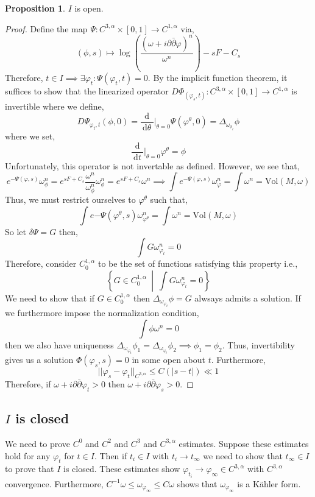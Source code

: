 \documentclass[12pt]{extarticle}
\renewcommand{\d}[1]{\: \mathrm{d}#1 \:}
\newcommand{\deriv}[2]{\frac{\d{#1}}{\d{#2}}}
\theoremstyle{definition}
\newtheorem{proposition}[theorem]{Proposition}
\begin{document}
\begin{proposition}
$I$ is open.
\end{proposition}

\begin{proof}
Define the map $\Psi : C^{3, \alpha} \times [0, 1] \to C^{1, \alpha}$ via,
\[ (\phi, s) \mapsto \log{\left( \frac{(\omega + i \partial \bar{\partial} \varphi)^n}{\omega^n} \right)} - s F - C_s \]
Therefore, $t \in I \implies \exists \varphi_t : \Psi(\varphi_t, t) = 0$. By the implicit function theorem, it suffices to show that the linearized operator $D \Phi_(\varphi_s, t) : C^{3, \alpha} \times [0, 1] \to C^{1, \alpha}$ is invertible where we define,
\[ D \Psi_{\varphi_t, t}(\phi, 0) = \deriv{}{\theta} \bigg|_{\theta = 0} \Psi(\varphi^\theta, 0) = \Delta_{\omega_{\phi_t}} \phi \] 
where we set,
\[ \deriv{}{t} \bigg|_{\theta = 0} \varphi^\theta = \phi \]
Unfortunately, this operator is not invertable as defined.
However, we see that,
\[ e^{- \Psi(\varphi, s)} \omega_{\phi}^n = e^{s F + C_s} \frac{\omega^n}{\omega_\phi^n} \omega_\phi^n = e^{s F + C_s} \omega^n \implies \int e^{-\Psi(\varphi, s)} \omega_{\varphi}^n = \int \omega^n = \mathrm{Vol}(M, \omega) \]
Thus, we must restrict ourselves to $\varphi^\theta$ such that,
\[ \int e{- \Psi(\varphi^\theta, s)} \omega_{\varphi^\theta}^n = \int \omega^n = \mathrm{Vol}(M, \omega) \]
So let $\delta \Psi = G$ then,
\[ \int G \omega_{\varphi_t}^n = 0 \]
Therefore, consider $C_0^{1, \alpha}$ to be the set of functions satisfying this property i.e.,
\[ \left\{ G \in C_0^{1, \alpha} \: \middle| \: \int G \omega_{\varphi_t}^n = 0 \right\} \]
We need to show that if $G \in C_0^{1, \alpha}$ then $\Delta_{\omega_{\varphi_t}} \phi = G$ alwsays admits a solution. If we furthermore impose the normalization condition,
\[ \int \phi \omega^n = 0 \]
then we also have uniqueness $\Delta_{\omega_{\varphi_t}} \phi_1 = \Delta_{\omega_{\varphi_t}} \phi_2 \implies \phi_1 =  \phi_2$. Thus, invertibility gives us a solution $\Phi(\varphi_s, s) = 0$ in some open about $t$. Furthermore,
\[ || \varphi_s - \varphi_t||_{C^{3, \alpha}} \le C(|s- t|) \ll 1 \]
Therefore, if $\omega + i \partial \bar{\partial} \varphi_t > 0$ then $\omega + i \partial \bar{\partial} \varphi_s > 0$. 
\end{proof}

\subsection{$I$ is closed}

We need to prove $C^0$ and $C^2$ and $C^3$ and $C^{3, \alpha}$ estimates. Suppose these estimates hold for any $\varphi_t$ for $t \in I$. Then if $t_i \in I$ with $t_i \to t_{\infty}$ we need to show that $t_{\infty} \in I$ to prove that $I$ is closed. These estimates show $\varphi_{t_i} \to \varphi_{\infty} \in C^{3, \alpha}$ with $C^{3, \alpha}$ convergence. Furthermore, $C^{-1} \omega \le \omega_{\varphi_{\infty}} \le C \omega$ shows that $\omega_{\varphi_{\infty}}$ is a K\"{a}hler form. 
\end{document}
